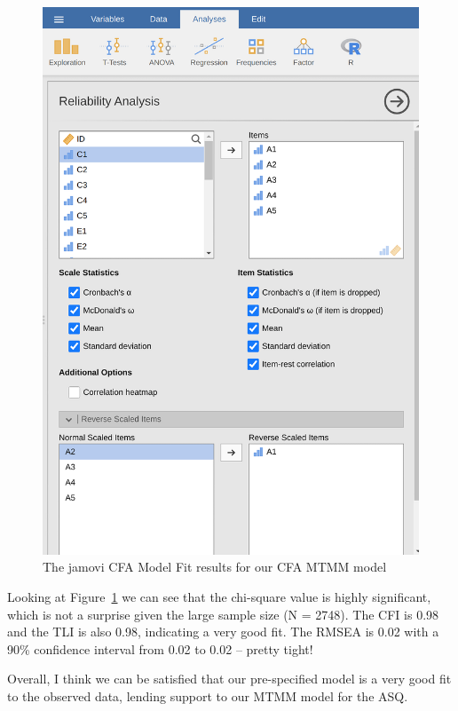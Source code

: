 \documentclass[
  a4paper,
]{book}
\begin{document}
\begin{figure}

\includegraphics[width=1\textwidth,height=\textheight]{images/fig15-25.png} \hfill{}

\caption{\label{fig-fig15-25}The jamovi CFA Model Fit results for our
CFA MTMM model}

\end{figure}

Looking at Figure~\ref{fig-fig15-25} we can see that the chi-square
value is highly significant, which is not a surprise given the large
sample size (N = 2748). The CFI is 0.98 and the TLI is also 0.98,
indicating a very good fit. The RMSEA is 0.02 with a 90\% confidence
interval from 0.02 to 0.02 -- pretty tight!

Overall, I think we can be satisfied that our pre-specified model is a
very good fit to the observed data, lending support to our MTMM model
for the ASQ.
\end{document}
